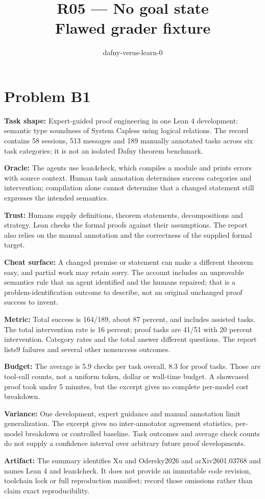\documentclass[11pt]{article}
\title{R05 --- No goal state \\ \large Flawed grader fixture}
\author{dafny-verus-learn-0}
\date{}
\begin{document}
\maketitle
\section*{Problem B1}\label{ans:B1}
\begin{answer}
\textbf{Task shape:} Expert-guided proof engineering in one Lean 4 development: semantic type soundness of System Capless using logical relations. The record contains 58 sessions, 513 messages and 189 manually annotated tasks across six task categories; it is not an isolated Dafny theorem benchmark.

\textbf{Oracle:} The agents use lean4check, which compiles a module and prints errors with source context. Human task annotation determines success categories and intervention; compilation alone cannot determine that a changed statement still expresses the intended semantics.

\textbf{Trust:} Humans supply definitions, theorem statements, decompositions and strategy. Lean checks the formal proofs against their assumptions. The report also relies on the manual annotation and the correctness of the supplied formal target.

\textbf{Cheat surface:} A changed premise or statement can make a different theorem easy, and partial work may retain sorry. The account includes an unprovable semantics rule that an agent identified and the humans repaired; that is a problem-identification outcome to describe, not an original unchanged proof success to invent.

\textbf{Metric:} Total success is 164/189, about 87 percent, and includes assisted tasks. The total intervention rate is 16 percent; proof tasks are 41/51 with 20 percent intervention. Category rates and the total answer different questions. The report lists9 failures and several other nonsuccess outcomes.

\textbf{Budget:} The average is 5.9 checks per task overall, 8.3 for proof tasks. Those are tool-call counts, not a uniform token, dollar or wall-time budget. A showcased proof took under 5 minutes, but the excerpt gives no complete per-model cost breakdown.

\textbf{Variance:} One development, expert guidance and manual annotation limit generalization. The excerpt gives no inter-annotator agreement statistics, per-model breakdown or controlled baseline. Task outcomes and average check counts do not supply a confidence interval over arbitrary future proof developments.

\textbf{Artifact:} The summary identifies Xu and Odersky2026 and arXiv2601.03768 and names Lean 4 and lean4check. It does not provide an immutable code revision, toolchain lock or full reproduction manifest; record those omissions rather than claim exact reproducibility.
\end{answer}
\end{document}
